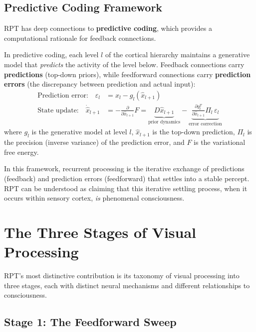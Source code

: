 \documentclass[11pt,a4paper]{report}
\begin{document}
\section{Predictive Coding Framework}

RPT has deep connections to \textbf{predictive coding}, which provides a computational rationale for feedback connections.

\begin{definitionbox}
In predictive coding, each level $l$ of the cortical hierarchy maintains a generative model that \emph{predicts} the activity of the level below. Feedback connections carry \textbf{predictions} (top-down priors), while feedforward connections carry \textbf{prediction errors} (the discrepancy between prediction and actual input):
\begin{align}
  \text{Prediction error:}\quad \varepsilon_l &= x_l - g_l(\hat{x}_{l+1}) \label{eq:pe} \\[4pt]
  \text{State update:}\quad \dot{\hat{x}}_{l+1} &= -\frac{\partial}{\partial \hat{x}_{l+1}} F = \underbrace{D\hat{x}_{l+1}}_{\text{prior dynamics}} - \underbrace{\frac{\partial g_l^T}{\partial \hat{x}_{l+1}} \Pi_l\, \varepsilon_l}_{\text{error correction}} \label{eq:update}
\end{align}
where $g_l$ is the generative model at level $l$, $\hat{x}_{l+1}$ is the top-down prediction, $\Pi_l$ is the precision (inverse variance) of the prediction error, and $F$ is the variational free energy.
\end{definitionbox}

In this framework, recurrent processing is the iterative exchange of predictions (feedback) and prediction errors (feedforward) that settles into a stable percept. RPT can be understood as claiming that this iterative settling process, when it occurs within sensory cortex, \emph{is} phenomenal consciousness.


\chapter{The Three Stages of Visual Processing}

RPT's most distinctive contribution is its taxonomy of visual processing into three stages, each with distinct neural mechanisms and different relationships to consciousness.

\section{Stage 1: The Feedforward Sweep}
\end{document}
